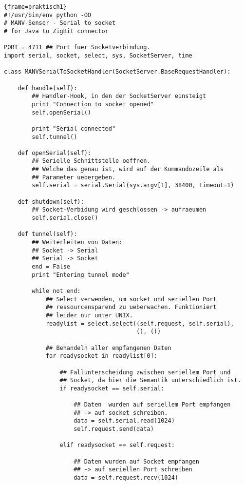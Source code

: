 \begin{lstlisting}{frame=praktisch1}
#!/usr/bin/env python -OO
# MANV-Sensor - Serial to socket
# for Java to ZigBit connector 

PORT = 4711 ## Port fuer Socketverbindung.
import serial, socket, select, sys, SocketServer, time

class MANVSerialToSocketHandler(SocketServer.BaseRequestHandler):

    def handle(self):
        ## Handler-Hook, in den der SocketServer einsteigt
        print "Connection to socket opened"
        self.openSerial()

        print "Serial connected"
        self.tunnel()

    def openSerial(self):
        ## Serielle Schnittstelle oeffnen.
        ## Welche das genau ist, wird auf der Kommandozeile als 
        ## Parameter uebergeben.
        self.serial = serial.Serial(sys.argv[1], 38400, timeout=1)

    def shutdown(self):
        ## Socket-Verbidung wird geschlossen -> aufraeumen
        self.serial.close()

    def tunnel(self):
        ## Weiterleiten von Daten:
        ## Socket -> Serial
        ## Serial -> Socket
        end = False
        print "Entering tunnel mode"

        while not end:
            ## Select verwenden, um socket und seriellen Port 
            ## ressourcensparend zu ueberwachen. Funktioniert
            ## leider nur unter UNIX.
            readylist = select.select((self.request, self.serial),
                                      (), ())

            ## Behandeln aller empfangenen Daten
            for readysocket in readylist[0]:

                ## Fallunterscheidung zwischen seriellem Port und 
                ## Socket, da hier die Semantik unterschiedlich ist.
                if readysocket == self.serial:

                    ## Daten  wurden auf seriellem Port empfangen
                    ## -> auf socket schreiben.
                    data = self.serial.read(1024)
                    self.request.send(data)

                elif readysocket == self.request:

                    ## Daten wurden auf Socket empfangen
                    ## -> auf seriellen Port schreiben
                    data = self.request.recv(1024)


\end{lstlisting}
